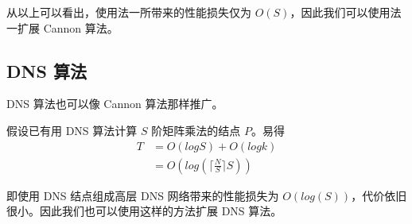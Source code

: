 \documentclass{zjureport-zh}
\begin{document}
\par 从以上可以看出，使用法一所带来的性能损失仅为 $O(S)$，因此我们可以使用法一扩展 Cannon 算法。

\subsection{DNS 算法}
\par DNS 算法也可以像 Cannon 算法那样推广。
\par 假设已有用 DNS 算法计算 $S$ 阶矩阵乘法的结点 $P$。易得
\begin{align*}
	T &= O(logS) + O(logk) \\
	  &= O(log(\lceil\frac{N}{S}\rceil S))
\end{align*}
\par 即使用 DNS 结点组成高层 DNS 网络带来的性能损失为 $O(log(S))$，代价依旧很小。因此我们也可以使用这样的方法扩展 DNS 算法。
\end{document}
